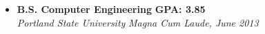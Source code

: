 \begin{itemize}
	\parskip=0.1em
	\item 
	\headerrow
        {\textbf{B.S. Computer Engineering}}
		{\textbf{GPA: 3.85}}
	\\
	\headerrow
		{\emph{Portland State University}}
		{\emph{Magna Cum Laude, June 2013}}
\end{itemize}
